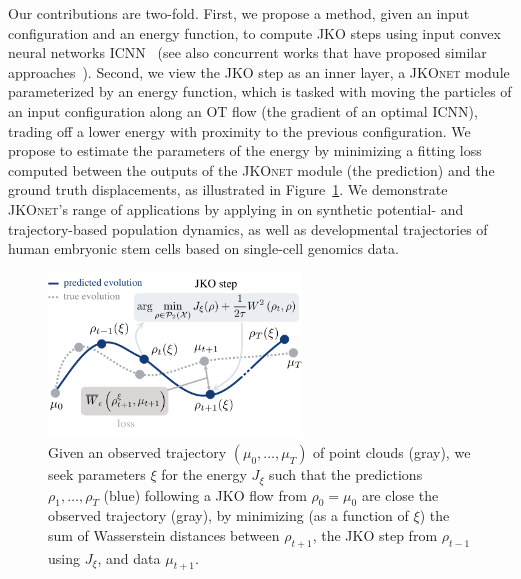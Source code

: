 Our contributions are two-fold. First, we propose a method, given an input configuration and an energy function, to compute \acrshort{JKO} steps using input convex neural networks \acrlong{ICNN}~\citep{amos2017input,makkuva2020optimal} (see also concurrent works that have proposed similar approaches~\citep{alvarez2021optimizing, mokrov2021large}). Second, we view the \acrshort{JKO} step as an inner layer, a \textsc{JKOnet} module parameterized by an energy function, which is tasked with moving the particles of an input configuration along an OT flow (the gradient of an optimal ICNN), trading off a lower energy with proximity to the previous configuration.
We propose to estimate the parameters of the energy by minimizing a fitting loss %
computed between the outputs of the \textsc{JKOnet} module (the prediction) and the ground truth displacements, as illustrated in Figure~\ref{fig:overview_jkonet}.
We demonstrate \textsc{JKOnet}'s range of applications by applying in on synthetic potential- and trajectory-based population dynamics, as well as developmental trajectories of human embryonic stem cells based on single-cell genomics data.

\begin{figure}[t]
    \centering
    \includegraphics[width=0.6\textwidth]{figures/fig_overview_jkonet.pdf}
    \caption{Given an observed trajectory $(\mu_0,\dots,\mu_T)$ of point clouds (gray), we seek parameters $\xi$ for the energy $J_\xi$ such that the predictions $\rho_1, \dots, \rho_T$ (blue) following a \acrshort{JKO} flow from $\rho_0=\mu_0$ are close the observed trajectory (gray), by minimizing (as a function of $\xi$) the sum of Wasserstein distances between $\rho_{t+1}$, the \acrshort{JKO} step from $\rho_{t-1}$ using $J_\xi$, and data $\mu_{t+1}$.}
    \label{fig:overview_jkonet}
\end{figure}

